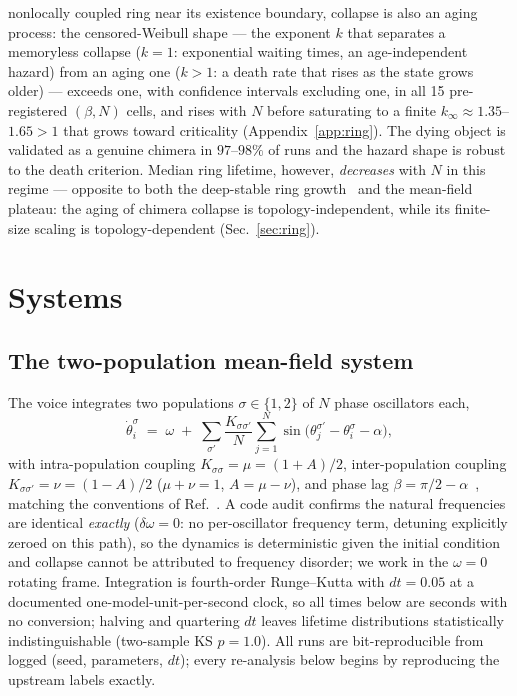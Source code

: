 \documentclass[pdflatex,sn-mathphys,Numbered]{sn-jnl}
\begin{document}
\begin{enumerate}
nonlocally coupled ring near its existence boundary, collapse is also an aging
process: the censored-Weibull shape --- the exponent $k$ that separates a
memoryless collapse ($k = 1$: exponential waiting times, an age-independent
hazard) from an aging one ($k > 1$: a death rate that rises as the state grows
older) --- exceeds one, with confidence intervals
excluding one, in all 15 pre-registered $(\beta, N)$ cells, and rises with $N$
before saturating to a finite $k_\infty \approx 1.35$--$1.65 > 1$ that grows toward
criticality (Appendix~\ref{app:ring}). The dying object is validated as a genuine
chimera in $97$--$98\%$ of runs and the hazard shape is robust to the death
criterion. Median ring lifetime, however, \emph{decreases} with $N$ in this regime
--- opposite to both the deep-stable ring growth~\cite{wo2011} and the mean-field
plateau: the aging of chimera collapse is topology-independent, while its
finite-size scaling is topology-dependent (Sec.~\ref{sec:ring}).
\end{enumerate}

\section{Systems}\label{sec:system}

\subsection{The two-population mean-field system}\label{sec:system:meanfield}

The voice integrates two populations $\sigma \in \{1, 2\}$ of $N$ phase oscillators
each,
\begin{equation}
\dot\theta_i^\sigma \;=\; \omega \;+\; \sum_{\sigma'} \frac{K_{\sigma\sigma'}}{N}
\sum_{j=1}^{N} \sin\!\big(\theta_j^{\sigma'} - \theta_i^{\sigma} - \alpha\big),
\label{eq:model}
\end{equation}
with intra-population coupling $K_{\sigma\sigma} = \mu = (1+A)/2$, inter-population
coupling $K_{\sigma\sigma'} = \nu = (1-A)/2$ ($\mu + \nu = 1$, $A = \mu - \nu$), and
phase lag $\beta = \pi/2 - \alpha$~\cite{kuramoto1984,sk1986}, matching the
conventions of Ref.~\cite{abrams2008}. A code audit confirms the natural frequencies are identical
\emph{exactly} ($\delta\omega = 0$: no per-oscillator frequency term, detuning
explicitly zeroed on this path), so the dynamics is deterministic given the initial
condition and collapse cannot be attributed to frequency disorder; we work in the
$\omega = 0$ rotating frame. Integration is fourth-order Runge--Kutta with
$dt = 0.05$ at a documented one-model-unit-per-second clock, so all times below are
seconds with no conversion; halving and quartering $dt$ leaves lifetime
distributions statistically indistinguishable (two-sample KS $p = 1.0$). All runs are
bit-reproducible from logged (seed, parameters, $dt$); every re-analysis below begins
by reproducing the upstream labels exactly.
\end{document}
